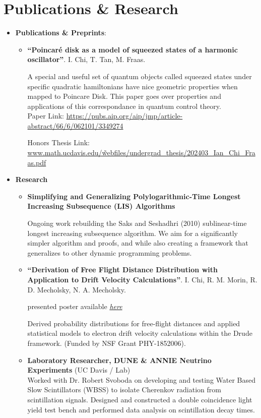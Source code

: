 \documentclass{curriculum-vitae}
\begin{document}
\section{Publications \& Research}
\begin{itemize}
  \item\textbf{Publications \& Preprints}:
    \begin{itemize}
      \item\label{pub: pub1} \textbf{``Poincar\'e disk as a model of squeezed states of a harmonic oscillator''}. I. Chi, T. Tan, M. Fraas.

        A special and useful set of quantum objects called squeezed states under specific quadratic hamiltonians have nice geometric properties when mapped to Poincare Disk. This paper goes over properties and applications of this correspondance in quantum control theory. \\
        Paper Link: \hyperlink{https://pubs.aip.org/aip/jmp/article-abstract/66/6/062101/3349274}{https://pubs.aip.org/aip/jmp/article-abstract/66/6/062101/3349274}

        Honors Thesis Link: \hyperlink{https://tinyurl.com/2pj46txh}{www.math.ucdavis.edu/\~webfiles/undergrad\_thesis/202403\_Ian\_Chi\_Fraas.pdf}



    \end{itemize}
  \item \textbf{Research}
    \begin{itemize}
      \item \textbf{Simplifying and Generalizing Polylogarithmic-Time Longest Increasing Subsequence (LIS) Algorithms}

        Ongoing work rebuilding the Saks and Seshadhri (2010) sublinear-time longest increasing subsequence algorithm. We aim  for a significantly simpler algorithm and proofs, and while also creating a framework that generalizes to other dynamic programming problems.
      \item \label{pub: pub2} \textbf{``Derivation of Free Flight Distance Distribution with Application to Drift Velocity Calculations''}. I. Chi, R. M. Morin, R. D. Mecholsky, N. A. Mecholsky.

        presented poster available \href{https://drive.google.com/file/d/1rUFjoE8ORksClzMPz6evIloqEMJk0EOd/view}{\emph{here}}

        Derived probability distributions for free-flight distances and applied statistical models to electron drift velocity calculations within the Drude framework.
        (Funded by NSF Grant PHY-1852006).
      \item \textbf{Laboratory Researcher, DUNE \& ANNIE Neutrino Experiments} (UC Davis / Lab) \\
        Worked with Dr. Robert Svoboda on developing and testing Water Based Slow Scintillators (WBSS) to isolate Cherenkov radiation from scintillation signals. Designed and constructed a double coincidence light yield test bench and performed data analysis on scintillation decay times.
    \end{itemize}

\end{itemize}
\end{document}
